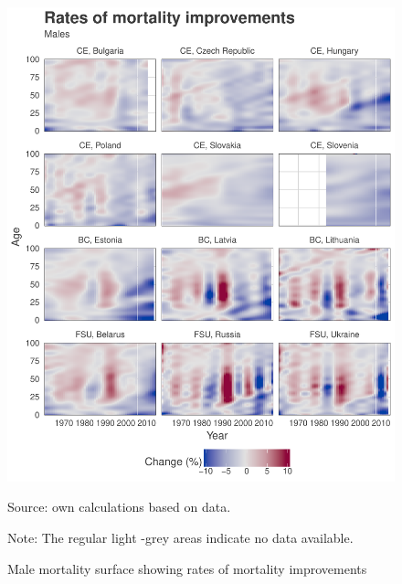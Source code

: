 \documentclass{article}
\begin{document}
\newpage

\begin{figure}[h!]
\caption{Male mortality surface showing rates of mortality improvements}
\label{Fig_ROMI}
\centering
\begin{center}
\includegraphics[scale=.55]{Figures/Figure_1.pdf}
\end{center}
Source: own calculations based on \citet{HMD} data. 
\begin{small}
Note: The regular light -grey areas indicate no data available.
\end{small}
\end{figure}
\end{document}
